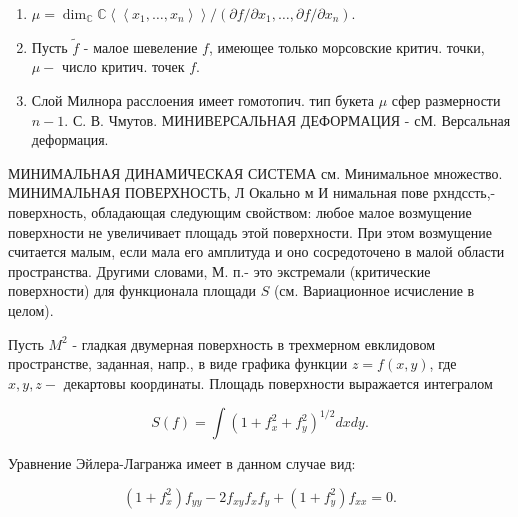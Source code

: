 \documentclass[10pt]{article}
\begin{document}
\begin{enumerate}

  \item $\mu=\operatorname{dim}_{\mathbb{C}} \mathbb{C}\left\langle\left\langle x_{1}, \ldots, x_{n}\right\rangle\right\rangle /\left(\partial f / \partial x_{1}, \ldots, \partial f / \partial x_{n}\right)$.



  \item Пусть $\widetilde{f}$ - малое шевеление $f$, имеющее только морсовские критич. точки, $\mu-$ число критич. точек $f$.



  \item Слой Милнора расслоения имеет гомотопич. тип букета $\mu$ сфер размерности $n-1$. С. В. Чмутов. МИНИВЕРСАЛЬНАЯ ДЕФОРМАЦИЯ - сМ. Версальная деформация.



\end{enumerate}



МИНИМАЛЬНАЯ ДИНАМИЧЕСКАЯ СИСТЕМА см. Минимальное множество. МИНИМАЛЬНАЯ ПОВЕРХНОСТЬ, Л Окально м И нимальная пове рхндссть,- поверхность, обладающая следующим свойством: любое малое возмущение поверхности не увеличивает площадь этой поверхности. При этом возмущение считается малым, если мала его амплитуда и оно сосредоточено в малой области пространства. Другими словами, М. п.- это экстремали (критические поверхности) для функционала площади $S$ (см. Вариационное исчисление в целом).



Пусть $M^{2}$ - гладкая двумерная поверхность в трехмерном евклидовом пространстве, заданная, напр., в виде графика функции $z=f(x, y)$, где $x, y, z-$ декартовы координаты. Площадь поверхности выражается интегралом



\[

S(f)=\int\left(1+f_{x}^{2}+f_{y}^{2}\right)^{1 / 2} d x d y .

\]



Уравнение Эйлера-Лагранжа имеет в данном случае вид:



\[

\left(1+f_{x}^{2}\right) f_{y y}-2 f_{x y} f_{x} f_{y}+\left(1+f_{y}^{2}\right) f_{x x}=0 .

\]
\end{document}
